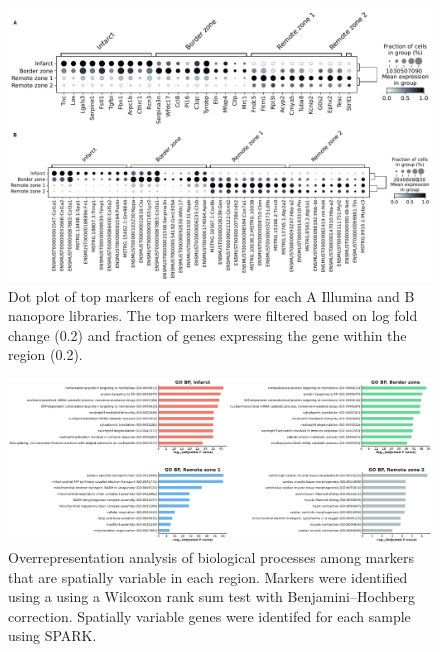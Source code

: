 \documentclass[utf8]{frontiers_suppmat} %
\begin{document}
\begin{figure}[htbp]
\begin{center}
\includegraphics[width=\textwidth]{figS5}%
\end{center}
\caption{Dot plot of top markers of each regions for each A Illumina and B nanopore libraries. The top markers were filtered based on log fold change (0.2) and fraction of genes expressing the gene within the region (0.2).}\label{fig:S5}
\end{figure}

\begin{figure}[htbp]
\begin{center}
\includegraphics[width=\textwidth]{figS6}%
\end{center}
\caption{Overrepresentation analysis of biological processes among markers that are spatially variable in each region. Markers were identified using a using a Wilcoxon rank sum test with Benjamini–Hochberg correction. Spatially variable genes were identifed for each sample using SPARK.}\label{fig:S6}
\end{figure}
\end{document}
